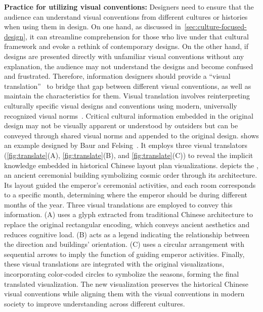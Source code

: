 \textbf{Practice for utilizing visual conventions:}
Designers need to ensure that the audience can understand visual conventions from different cultures or histories when using them in design.
On one hand, as discussed in~\cref{sec:culture-focused-design}, it can streamline comprehension for those who live under that cultural framework and evoke a rethink of contemporary designs.
On the other hand, if designs are presented directly with unfamiliar visual conventions without any explanation, the audience may not understand the designs and become confused and frustrated.
Therefore, information designers should provide a ``visual translation''~\cite{Baur2019Cultural} to bridge that gap between different visual conventions, as well as maintain the characteristics for them.
Visual translation involves reinterpreting culturally specific visual designs and conventions using modern, universally recognized visual norms~\cite{Baur2019Cultural}. 
Critical cultural information embedded in the original design may not be visually apparent or understood by outsiders but can be conveyed through shared visual norms and appended to the original design.
 shows an example designed by Baur and Felsing~\cite{Baur2020Visual}.
It employs three visual translators (\cref{fig:translate}(A), \cref{fig:translate}(B), and \cref{fig:translate}(C)) to reveal the implicit knowledge embedded in historical Chinese layout plan visualizations.
 depicts the , an ancient ceremonial building symbolizing cosmic order through its architecture.
Its layout guided the emperor's ceremonial activities, and each room corresponds to a specific month, determining where the emperor should be during different months of the year.
Three visual translations are employed to convey this information.
(A) uses a glyph extracted from traditional Chinese architecture to replace the original rectangular encoding, which conveys ancient aesthetics and reduces cognitive load. 
(B) acts as a legend indicating the relationship between the direction and buildings' orientation. 
(C) uses a circular arrangement with sequential arrows to imply the function of guiding emperor activities.
Finally, these visual translations are integrated with the original visualizations, incorporating color-coded circles to symbolize the seasons, forming the final translated visualization. 
The new visualization preserves the historical Chinese visual conventions while aligning them with the visual conventions in modern society to improve understanding across different cultures.
